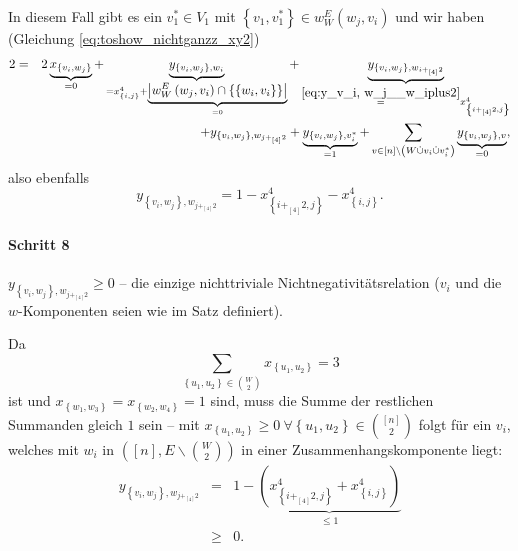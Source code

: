\documentclass[10p,a4paper,BCOR = 12mm, DIV=15]{scrbook}
\begin{document}
\begin{bew}
In diesem Fall gibt es ein $v_1^* \in V_1$ mit $\left\{v_1, v_1^*\right\} \in w_W^E\left(w_j, v_i\right)$ und wir haben (Gleichung \eqref{eq:toshow_nichtganzz_xy2})
\begin{eqnarray*}
2 & = & 2 \underbrace{x_{\left\{v_i, w_j\right\}}}_{= 0} + \underbrace{y_{\left\{v_i, w_j\right\}, w_i}}_{= x^{4}_{\left\{i, j\right\}} + \underbrace{\left|w_W^E\left(w_j, v_i\right) \cap \left\{\left\{w_i, v_i\right\}\right\}\right|}_{= 0}} + \underbrace{y_{\left\{v_i, w_j\right\}, w_{i +_{\left[4\right]} 2}}}_{\stackrel{\eqref{eq:y_v_i, w_j__w_iplus2}}{=} x^{4}_{\left\{i+_{\left[4\right]} 2, j\right\}}} \\
& & + y_{\left\{v_i, w_j\right\}, w_{j +_{\left[4\right]} 2}} + \underbrace{y_{\left\{v_i, w_j\right\}, v_i^*}}_{= 1} + \sum_{v \in \left[n\right] \backslash \left(W \mathbin{\dot{\cup}} v_i \mathbin{\dot{\cup}} v_i^*\right)} \underbrace{y_{\left\{v_i, w_j\right\}, v}}_{= 0},
\end{eqnarray*}
also ebenfalls
\begin{displaymath}
y_{\left\{v_i, w_j\right\}, w_{j +_{\left[4\right]} 2}} = 1 - x^{4}_{\left\{i+_{\left[4\right]} 2, j\right\}} - x^{4}_{\left\{i, j\right\}}.
\end{displaymath}

\paragraph{Schritt 8} $y_{\left\{v_i, w_j\right\}, w_{j +_{\left[4\right]} 2}} \geq 0$ -- die einzige nichttriviale Nichtnegativitätsrelation ($v_i$ und die $w$-Komponenten seien wie im Satz definiert).

Da
\begin{displaymath}
\sum_{\left\{u_1, u_2\right\} \in {W \choose 2}} x_{\left\{u_1, u_2\right\}} = 3
\end{displaymath}
ist und $x_{\left\{w_1, w_3\right\}} = x_{\left\{w_2, w_4\right\}} = 1$ sind, muss die Summe der restlichen Summanden gleich $1$ sein -- mit $x_{\left\{u_1, u_2\right\}} \geq 0 \ \forall \left\{u_1, u_2\right\} \in {\left[n\right] \choose 2}$ folgt für ein $v_i$, welches mit $w_i$ in $\left(\left[n\right], E \backslash {W \choose 2}\right)$ in einer Zusammenhangskomponente liegt:
\begin{eqnarray*}
y_{\left\{v_i, w_j\right\}, w_{j +_{\left[4\right]} 2}} & = & 1 - \underbrace{\left( x^{4}_{\left\{i+_{\left[4\right]} 2, j\right\}} 
+ x^{4}_{\left\{i, j\right\}}\right)}_{\leq 1} \\
& \geq & 0.
\end{eqnarray*}


\end{bew}
\end{document}
